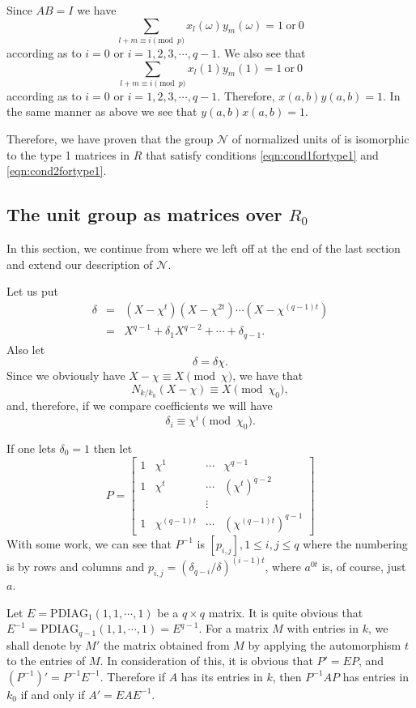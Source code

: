 \documentclass[11pt]{report}
\begin{document}
Since $AB = I$ we have
\[\sum_{l+m\equiv i\pmod{p}}x_l(\omega)y_m(\omega) = 1 \mathrm{\ or\ } 0\]
according as to $i=0$ or $i=1,2,3,\cdots,q-1$.
We also see that
\[\sum_{l+m\equiv i\pmod{p}}x_l(1)y_m(1) = 1 \mathrm{\ or\ } 0\]
according as to $i=0$ or $i=1,2,3,\cdots,q-1$. Therefore, $x(a,b)y(a,b) = 
1$. In the same manner as
above we see that $y(a,b)x(a,b) = 1$.


        Therefore, we have proven that the group $\mathscr{N}$
 of normalized units of 
\intG{} is isomorphic
to the type 1 matrices in $R$ that satisfy conditions  \ref{eqn:cond1fortype1} and 
\ref{eqn:cond2fortype1}.

\subsection{The unit group as matrices over $R_0$}
        In this section, we continue from where we left off at the end of 
the last section and
extend our description of $\mathscr{N}$.

  Let us put
\begin{align*}
\delta&=&(X-\chi^t)(X-\chi^{2t}) \cdots (X-\chi^{(q-1)t})\\
&=&X^{q-1}+\delta_1X^{q-2}+\cdots+\delta_{q-1}.
\end{align*}
Also let\[\delta=\delta{\chi}.\]
Since we obviously have $X-\chi \equiv X\pmod{\chi}$, we have that
\[N_{k/k_0}(X-\chi) \equiv X \pmod{\chi_0},\]
and, therefore, if we compare coefficients we will have
\begin{equation}
\delta_i\equiv \chi^i\pmod{\chi_0}.
\label{eqn:deltaiequiv}
\end{equation}

If one lets $\delta_0 = 1$ then let
\[
P= 
\begin{bmatrix}
1&\chi^1 &\cdots&\chi^{q-1}\\
1&\chi^t &\cdots&(\chi^t)^{q-2}\\
&&\vdots& \\
1& \chi^{(q-1)t} &\cdots&(\chi^{(q-1)t})^{q-1}
\end{bmatrix}
\]
With some work, we can see that $P^{-1}$ is $[p_{i,j}], 1\le{} i,j \le{}q$
where the numbering 
is by rows and
columns and $p_{i,j} = (\delta_{q-i}/\delta)^{(i-1)t}$, where $a^{0t}$
is, of course, just $a$.

        Let $E = \mathrm{PDIAG}_1(1,1,\cdots,1)$ be a $q \times q$
 matrix. It is quite obvious that
$E^{-1} = \mathrm{PDIAG}_{q-1}(1,1,\cdots,1) =  E^{q-1}$. 
For a matrix $M$ with entries in $k$, we shall denote 
by $M'$ the
matrix obtained from $M$ by applying the automorphism $t$ to the 
entries of $M$. In consideration
of this, it is obvious that $P' = EP$, and $(P^{-1})' = P^{-1}E^{-1}$. 
Therefore if $A$ has its entries in $k$, then
$P^{-1}AP$ has entries in $k_0$ if and only if
$A' =  E A E^{-1}$.
\end{document}
